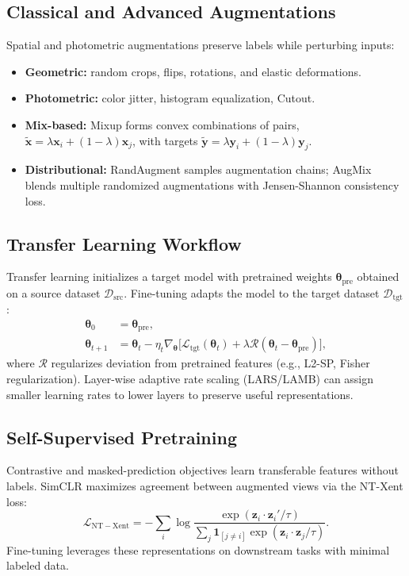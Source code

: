 \documentclass{article}
\begin{document}
\subsection{Classical and Advanced Augmentations}
Spatial and photometric augmentations preserve labels while perturbing inputs:
\begin{itemize}
  \item \textbf{Geometric:} random crops, flips, rotations, and elastic deformations.
  \item \textbf{Photometric:} color jitter, histogram equalization, Cutout.
  \item \textbf{Mix-based:} Mixup forms convex combinations of pairs, $\tilde{\mathbf{x}} = \lambda \mathbf{x}_i + (1-\lambda)\mathbf{x}_j$, with targets $\tilde{\mathbf{y}} = \lambda \mathbf{y}_i + (1-\lambda)\mathbf{y}_j$.
  \item \textbf{Distributional:} RandAugment samples augmentation chains; AugMix blends multiple randomized augmentations with Jensen-Shannon consistency loss.
\end{itemize}

\subsection{Transfer Learning Workflow}
Transfer learning initializes a target model with pretrained weights $\boldsymbol{\theta}_{\mathrm{pre}}$ obtained on a source dataset $\mathcal{D}_{\mathrm{src}}$. Fine-tuning adapts the model to the target dataset $\mathcal{D}_{\mathrm{tgt}}$:
\begin{align}
  \boldsymbol{\theta}_0 &= \boldsymbol{\theta}_{\mathrm{pre}}, \\
  \boldsymbol{\theta}_{t+1} &= \boldsymbol{\theta}_t - \eta_t \nabla_{\boldsymbol{\theta}} \bigl[\mathcal{L}_{\mathrm{tgt}}(\boldsymbol{\theta}_t) + \lambda \mathcal{R}(\boldsymbol{\theta}_t - \boldsymbol{\theta}_{\mathrm{pre}})\bigr],
\end{align}
where $\mathcal{R}$ regularizes deviation from pretrained features (e.g., L2-SP, Fisher regularization). Layer-wise adaptive rate scaling (LARS/LAMB) can assign smaller learning rates to lower layers to preserve useful representations.

\subsection{Self-Supervised Pretraining}
Contrastive and masked-prediction objectives learn transferable features without labels. SimCLR maximizes agreement between augmented views via the NT-Xent loss:
\begin{equation}
  \mathcal{L}_{\mathrm{NT-Xent}} = -\sum_{i} \log \frac{\exp(\mathbf{z}_i \cdot \mathbf{z}_{i}' / \tau)}{\sum_{j} \mathbf{1}_{[j \neq i]} \exp(\mathbf{z}_i \cdot \mathbf{z}_j / \tau)}.
\end{equation}
Fine-tuning leverages these representations on downstream tasks with minimal labeled data.
\end{document}
